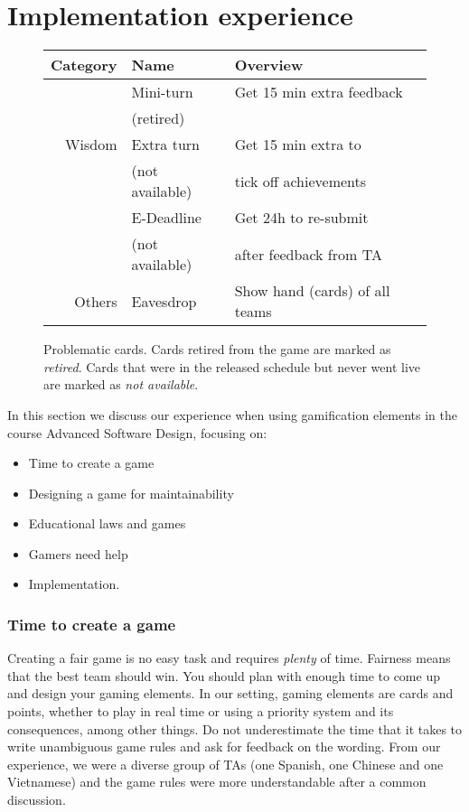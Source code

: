 \documentclass[sigconf]{acmart}
\begin{document}
\hypertarget{sec:implementation}{%
\section{Implementation experience}\label{sec:implementation}}

\begin{figure}[t]
\begin{tabular}{|r|l|l|}
\hline
Category & Name & Overview \\
\hline
& Mini-turn & Get 15 min extra feedback  \\
& (retired) & \\ \cline{2-3}
Wisdom & Extra turn & Get 15 min extra to \\
& (not available) & tick off achievements \\ \cline{2-3}
& E-Deadline & Get 24h to re-submit  \\
& (not available) & after feedback from TA \\ \cline{2-3}
\hline
Others & Eavesdrop & Show hand (cards) of all teams \\
\hline
\end{tabular}
\caption{\label{fig:ncards}Problematic cards.
Cards retired from the game are marked as \emph{retired}.
Cards that were in the released schedule but
never went live are marked as \emph{not available}.}
\end{figure}

In this section we discuss our experience when using gamification
elements in the course Advanced Software Design, focusing on:

\begin{itemize}
\item Time to create a game
\item Designing a game for maintainability
\item Educational laws and games
\item Gamers need help
\item Implementation.
\end{itemize}

\hypertarget{time-to-create-a-game}{%
\subsubsection*{Time to create a game}\label{time-to-create-a-game}}

Creating a fair game is no easy task and requires \emph{plenty} of time.
Fairness means that the best team should win. You should plan with
enough time to come up and design your gaming elements. In our setting,
gaming elements are cards and points, whether to play in real time or
using a priority system and its consequences, among other things. Do not
underestimate the time that it takes to write unambiguous game rules and
ask for feedback on the wording. From our experience, we were a diverse
group of TAs (one Spanish, one Chinese and one Vietnamese) and the game
rules were more understandable after a common discussion.
\end{document}
